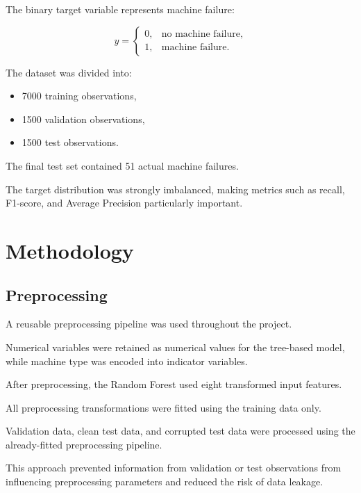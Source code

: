 \documentclass[conference]{IEEEtran}
\begin{document}
The binary target variable represents machine failure:

\[
y =
\begin{cases}
0, & \text{no machine failure},\\
1, & \text{machine failure}.
\end{cases}
\]

The dataset was divided into:

\begin{itemize}

    \item 7000 training observations,
    \item 1500 validation observations,
    \item 1500 test observations.

\end{itemize}

The final test set contained 51 actual machine failures.

The target distribution was strongly imbalanced, making metrics such as recall, F1-score, and Average Precision particularly important.


\section{Methodology}

\subsection{Preprocessing}

A reusable preprocessing pipeline was used throughout the project.

Numerical variables were retained as numerical values for the tree-based model, while machine type was encoded into indicator variables.

After preprocessing, the Random Forest used eight transformed input features.

All preprocessing transformations were fitted using the training data only.

Validation data, clean test data, and corrupted test data were processed using the already-fitted preprocessing pipeline.

This approach prevented information from validation or test observations from influencing preprocessing parameters and reduced the risk of data leakage.
\end{document}

